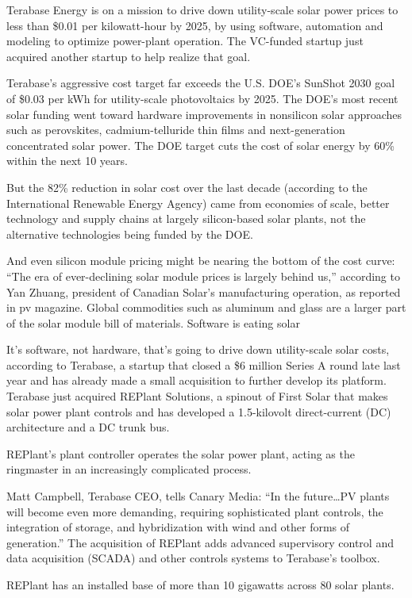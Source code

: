 \documentclass[
]{book}
\begin{document}
Terabase Energy is on a mission to drive down utility-scale solar power prices to less than \$0.01 per kilowatt-hour by 2025, by using software, automation and modeling to optimize power-plant operation. The VC-funded startup just acquired another startup to help realize that goal.

Terabase's aggressive cost target far exceeds the U.S. DOE's SunShot 2030 goal of \$0.03 per kWh for utility-scale photovoltaics by 2025. The DOE's most recent solar funding went toward hardware improvements in nonsilicon solar approaches such as perovskites, cadmium-telluride thin films and next-generation concentrated solar power. The DOE target cuts the cost of solar energy by 60\% within the next 10 years.

But the 82\% reduction in solar cost over the last decade (according to the International Renewable Energy Agency) came from economies of scale, better technology and supply chains at largely silicon-based solar plants, not the alternative technologies being funded by the DOE.

And even silicon module pricing might be nearing the bottom of the cost curve: ``The era of ever-declining solar module prices is largely behind us,'' according to Yan Zhuang, president of Canadian Solar's manufacturing operation, as reported in pv magazine. Global commodities such as aluminum and glass are a larger part of the solar module bill of materials.
Software is eating solar

It's software, not hardware, that's going to drive down utility-scale solar costs, according to Terabase, a startup that closed a \$6 million Series A round late last year and has already made a small acquisition to further develop its platform. Terabase just acquired REPlant Solutions, a spinout of First Solar that makes solar power plant controls and has developed a 1.5-kilovolt direct-current (DC) architecture and a DC trunk bus.

REPlant's plant controller operates the solar power plant, acting as the ringmaster in an increasingly complicated process.

Matt Campbell, Terabase CEO, tells Canary Media: ``In the future\ldots PV plants will become even more demanding, requiring sophisticated plant controls, the integration of storage, and hybridization with wind and other forms of generation.'' The acquisition of REPlant adds advanced supervisory control and data acquisition (SCADA) and other controls systems to Terabase's toolbox.

REPlant has an installed base of more than 10 gigawatts across 80 solar plants.
\end{document}
